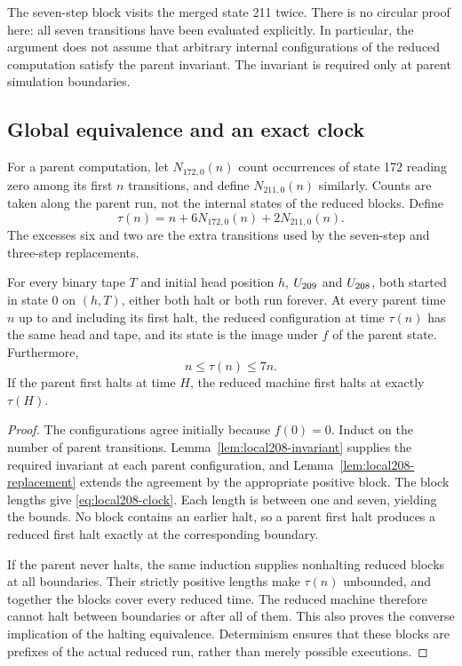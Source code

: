 The seven-step block visits the merged state 211 twice. There is no
circular proof here: all seven transitions have been evaluated explicitly.
In particular, the argument does not assume that arbitrary internal
configurations of the reduced computation satisfy the parent invariant.
The invariant is required only at parent simulation boundaries.

\subsection{Global equivalence and an exact clock}
\label{subsec:local208-global}

For a parent computation, let $N_{172,0}(n)$ count occurrences of state 172
reading zero among its first $n$ transitions, and define $N_{211,0}(n)$
similarly. Counts are taken along the parent run, not the internal states
of the reduced blocks. Define
\begin{equation}
\label{eq:local208-clock}
 \tau(n)=n+6N_{172,0}(n)+2N_{211,0}(n).
\end{equation}
The excesses six and two are the extra transitions used by the seven-step
and three-step replacements.

\begin{theorem}
\label{thm:local208-equivalence}
For every binary tape $T$ and initial head position $h$, $U_{209}$ and
$U_{208}$, both started in state 0 on $(h,T)$, either both halt or both
run forever. At every parent time $n$ up to and including its first halt,
the reduced configuration at time $\tau(n)$ has the same head and tape,
and its state is the image under $f$ of the parent state. Furthermore,
\[
 n\le\tau(n)\le7n.
\]
If the parent first halts at time $H$, the reduced machine first halts
at exactly $\tau(H)$.
\end{theorem}
\begin{proof}
The configurations agree initially because $f(0)=0$. Induct on the number
of parent transitions. Lemma~\ref{lem:local208-invariant} supplies the
required invariant at each parent configuration, and
Lemma~\ref{lem:local208-replacement} extends the agreement by the
appropriate positive block. The block lengths give
\eqref{eq:local208-clock}. Each length is between one and seven, yielding
the bounds. No block contains an earlier halt, so a parent first halt
produces a reduced first halt exactly at the corresponding boundary.

If the parent never halts, the same induction supplies nonhalting reduced
blocks at all boundaries. Their strictly positive lengths make
$\tau(n)$ unbounded, and together the blocks cover every reduced time.
The reduced machine therefore cannot halt between boundaries or after
all of them. This also proves the converse implication of the halting
equivalence. Determinism ensures that these blocks are prefixes of the
actual reduced run, rather than merely possible executions.
\end{proof}

